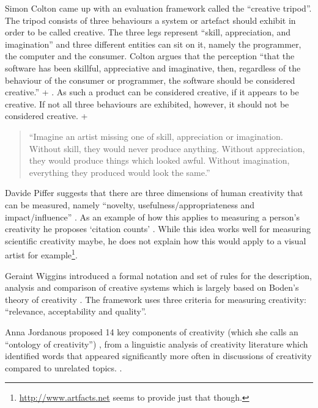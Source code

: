 Simon Colton came up with an evaluation framework called the ``creative tripod''. The tripod consists of three behaviours a system or artefact should exhibit in order to be called creative. The three legs represent ``skill, appreciation, and imagination'' and three different entities can sit on it, namely the programmer, the computer and the consumer. Colton argues that the perception ``that the software has been skillful, appreciative and imaginative, then, regardless of the behaviour of the consumer or programmer, the software should be considered creative.'' \citeyear[p.5]{Colton2008a} + \citeyear[p.5]{Colton2008}. As such a product can be considered creative, if it appears to be creative. If not all three behaviours are exhibited, however, it should not be considered creative. \autocite[p.5]{Colton2008a} + \autocite[p.5]{Colton2008}

\begin{quotation}
  ``Imagine an artist missing one of skill, appreciation or imagination. Without skill, they would never produce anything. Without appreciation, they would produce things which looked awful. Without imagination, everything they produced would look the same.'' 
\end{quotation}

Davide Piffer suggests that there are three dimensions of human creativity that can be measured, namely ``novelty, usefulness/appropriateness and impact/influence'' \citeyear[p.258-259]{Piffer2012}. As an example of how this applies to measuring a person's creativity he proposes `citation counts' \autocite[p.261]{Piffer2012}. While this idea works well for measuring scientific creativity maybe, he does not explain how this would apply to a visual artist for example\footnote{\url{http://www.artfacts.net} seems to provide just that though.}.

Geraint Wiggins introduced a formal notation and set of rules for the description, analysis and comparison of creative systems \citeyear{Wiggins2006} which is largely based on Boden's theory of creativity \citeyear{Boden2003}. The framework uses three criteria for measuring creativity: ``relevance, acceptability and quality''.

Anna Jordanous proposed 14 key components of creativity (which she calls an  ``ontology of creativity'') \citeyear[p.104-120]{Jordanous2012}, from a linguistic analysis of creativity literature which identified words that appeared significantly more often in discussions of creativity compared to unrelated topics. \citeyear[p.120]{Jordanous2012}.

